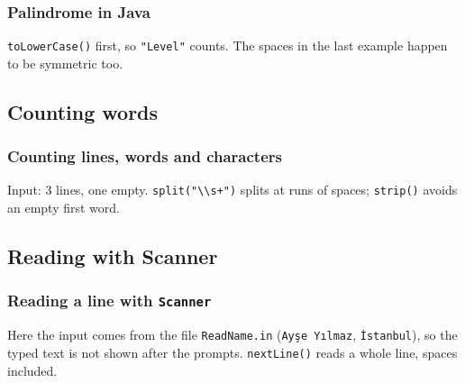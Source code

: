 \documentclass[aspectratio=169,10pt,compress]{beamer}
\begin{document}
\begin{frame}[t,fragile] \frametitle{Palindrome in Java}

  \vspace{0.3em}
  \small \texttt{toLowerCase()} first, so \texttt{"Level"} counts. The spaces in the last example happen to be symmetric too.
\end{frame}

\subsection[Count words]{Counting words}




\begin{frame}[t,fragile] \frametitle{Counting lines, words and characters}

  \vspace{0.3em}
  \small Input: 3 lines, one empty. \texttt{split("\textbackslash\textbackslash s+")} splits at runs of spaces; \texttt{strip()} avoids an empty first word.
\end{frame}





\subsection[Scanner]{Reading with Scanner}




\begin{frame}[t,fragile] \frametitle{Reading a line with \texttt{Scanner}}

  \vspace{0.3em}
  \small Here the input comes from the file \texttt{ReadName.in} (\texttt{Ayşe Yılmaz}, \texttt{İstanbul}),
  so the typed text is not shown after the prompts. \texttt{nextLine()} reads a whole line, spaces included.
\end{frame}
\end{document}
